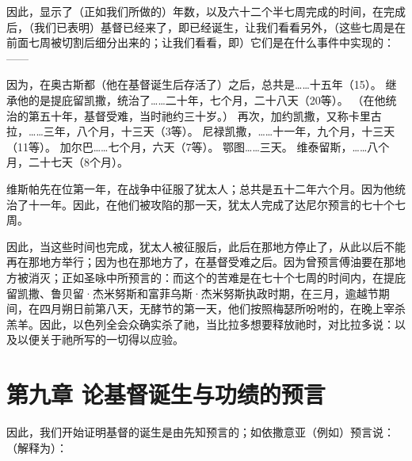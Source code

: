 因此，显示了（正如我们所做的）年数，以及六十二个半七周完成的时间，在完成后，（我们已表明）基督已经来了，即已经诞生，让我们看看另外，（这些七周是在前面七周被切割后细分出来的；让我们看看，即）它们是在什么事件中实现的：——\par

因为，在奥古斯都（他在基督诞生后存活了）之后，总共是……十五年（15）。\newline{} 继承他的是提庇留凯撒，统治了……二十年，七个月，二十八天（20等）。\newline{} （在他统治的第五十年，基督受难，当时祂约三十岁。）\newline{} 再次，加约凯撒，又称卡里古拉，……三年，八个月，十三天（3等）。\newline{} 尼禄凯撒，……十一年，九个月，十三天（11等）。\newline{} 加尔巴……七个月，六天（7等）。\newline{} 鄂图……三天。\newline{} 维泰留斯，……八个月，二十七天（8个月）。\par

维斯帕先在位第一年，在战争中征服了犹太人；总共是五十二年六个月。因为他统治了十一年。因此，在他们被攻陷的那一天，犹太人完成了达尼尔预言的七十个七周。\par

因此，当这些时间也完成，犹太人被征服后，此后在那地方停止了，从此以后不能再在那地方举行；因为也在那地方了，在基督受难之后。因为曾预言傅油要在那地方被消灭；正如圣咏中所预言的：而这个的苦难是在七十个七周的时间内，在提庇留凯撒、鲁贝留·杰米努斯和富菲乌斯·杰米努斯执政时期，在三月，逾越节期间，在四月朔日前第八天，无酵节的第一天，他们按照梅瑟所吩咐的，在晚上宰杀羔羊。因此，以色列全会众确实杀了祂，当比拉多想要释放祂时，对比拉多说：以及以便关于祂所写的一切得以应验。\par


\section{第九章 论基督诞生与功绩的预言}

因此，我们开始证明基督的诞生是由先知预言的；如依撒意亚（例如）预言说：（解释为）：\par

